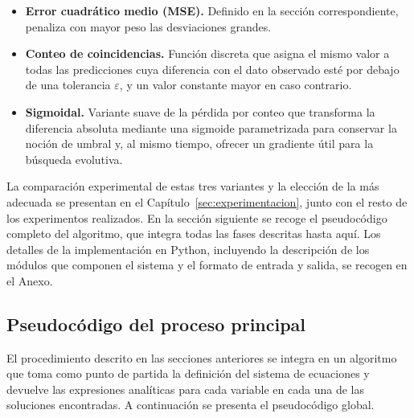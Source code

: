 \documentclass{article} \usepackage[utf8]{inputenc} \usepackage[spanish]{babel} \spanishdecimal{.} \usepackage{amsmath, amssymb, amsthm} \usepackage{bm} \usepackage{float} \usepackage{longtable} \usepackage[hidelinks]{hyperref}
\begin{document}
\begin{itemize} \item \textbf{Error cuadrático medio (MSE).} Definido en la sección correspondiente, penaliza con mayor peso las desviaciones grandes. \item \textbf{Conteo de coincidencias.} Función discreta que asigna el mismo valor a todas las predicciones cuya diferencia con el dato observado esté por debajo de una tolerancia \(\varepsilon\), y un valor constante mayor en caso contrario. \item \textbf{Sigmoidal.} Variante suave de la pérdida por conteo que transforma la diferencia absoluta mediante una sigmoide parametrizada para conservar la noción de umbral y, al mismo tiempo, ofrecer un gradiente útil para la búsqueda evolutiva. \end{itemize}

La comparación experimental de estas tres variantes y la elección de la más adecuada se presentan en el Capítulo~\ref{sec:experimentacion}, junto con el resto de los experimentos realizados. En la sección siguiente se recoge el pseudocódigo completo del algoritmo, que integra todas las fases descritas hasta aquí. Los detalles de la implementación en Python, incluyendo la descripción de los módulos que componen el sistema y el formato de entrada y salida, se recogen en el Anexo.


\subsection{Pseudocódigo del proceso principal} \label{sec:pseudocodigo_principal}

El procedimiento descrito en las secciones anteriores se integra en un algoritmo que toma como punto de partida la definición del sistema de ecuaciones y devuelve las expresiones analíticas para cada variable en cada una de las soluciones encontradas. A continuación se presenta el pseudocódigo global.
\end{document}
